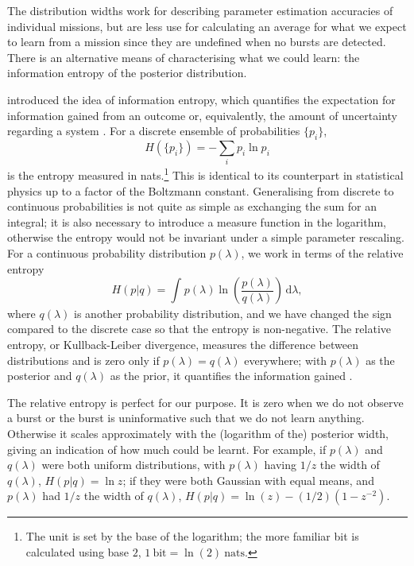 \documentclass[useAMS,usedcolumn,usegraphicx,usenatbib]{mn2e}
\newcommand{\units}[1]{\ensuremath{~\mathrm{#1}}}
\newcommand{\dd}{\ensuremath{\mathrm{d}}}
\newcommand{\intd}[4]{\ensuremath{\displaystyle \int_{#1}^{#2}{#3}\,\dd{#4}}}
\begin{document}
The distribution widths work for describing parameter estimation accuracies of individual missions, but are less use for calculating an average for what we expect to learn from a mission since they are undefined when no bursts are detected. There is an alternative means of characterising what we could learn: the information entropy of the posterior distribution.

\citet{Shannon1948,Shannon1948a} introduced the idea of information entropy, which quantifies the expectation for information gained from an outcome or, equivalently, the amount of uncertainty regarding a system \citep[chapters 2 and 4]{MacKay2003}. For a discrete ensemble of probabilities $\{p_i\}$,
\begin{equation}
H(\{p_i\}) = -\sum_i p_i \ln p_i
\end{equation}
is the entropy measured in nats.\footnote{The unit is set by the base of the logarithm; the more familiar bit is calculated using base $2$, $1\units{bit} = \ln(2)\units{nats}$.} This is identical to its counterpart in statistical physics up to a factor of the Boltzmann constant. Generalising from discrete to continuous probabilities is not quite as simple as exchanging the sum for an integral; it is also necessary to introduce a measure function in the logarithm, otherwise the entropy would not be invariant under a simple parameter rescaling. For a continuous probability distribution $p(\lambda)$, we work in terms of the relative entropy \citep[section 1.4]{Ihara1993}
\begin{equation}
H(p|q) = \intd{}{}{p(\lambda)\ln\left(\frac{p(\lambda)}{q(\lambda)}\right)}{\lambda},
\end{equation}
where $q(\lambda)$ is another probability distribution, and we have changed the sign compared to the discrete case so that the entropy is non-negative. The relative entropy, or Kullback-Leiber divergence, measures the difference between distributions and is zero only if $p(\lambda) = q(\lambda)$ everywhere; with $p(\lambda)$ as the posterior and $q(\lambda)$ as the prior, it quantifies the information gained \citep{Kullback1951}.

The relative entropy is perfect for our purpose. It is zero when we do not observe a burst or the burst is uninformative such that we do not learn anything. Otherwise it scales approximately with the (logarithm of the) posterior width, giving an indication of how much could be learnt. For example, if $p(\lambda)$ and $q(\lambda)$ were both uniform distributions, with $p(\lambda)$ having $1/z$ the width of $q(\lambda)$, $H(p|q) = \ln z$; if they were both Gaussian with equal means, and $p(\lambda)$ had $1/z$ the width of $q(\lambda)$, $H(p|q) = \ln(z) - (1/2)(1 - z^{-2})$.
\end{document}
